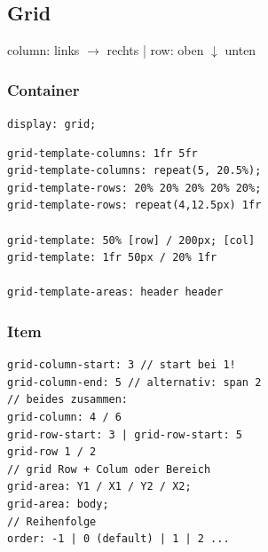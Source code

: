 \subsection{Grid}
column: links $\rightarrow$ rechts | row: oben $\downarrow$ unten
\subsubsection{Container}
\texttt{\scriptsize display: grid;}
\begin{lstlisting}
grid-template-columns: 1fr 5fr
grid-template-columns: repeat(5, 20.5%);
grid-template-rows: 20% 20% 20% 20% 20%;
grid-template-rows: repeat(4,12.5px) 1fr

grid-template: 50% [row] / 200px; [col]
grid-template: 1fr 50px / 20% 1fr

grid-template-areas: header header

\end{lstlisting}

\subsubsection{Item}
\begin{lstlisting}
grid-column-start: 3 // start bei 1!
grid-column-end: 5 // alternativ: span 2
// beides zusammen:
grid-column: 4 / 6
grid-row-start: 3 | grid-row-start: 5
grid-row 1 / 2
// grid Row + Colum oder Bereich
grid-area: Y1 / X1 / Y2 / X2;
grid-area: body;
// Reihenfolge
order: -1 | 0 (default) | 1 | 2 ...
\end{lstlisting}




